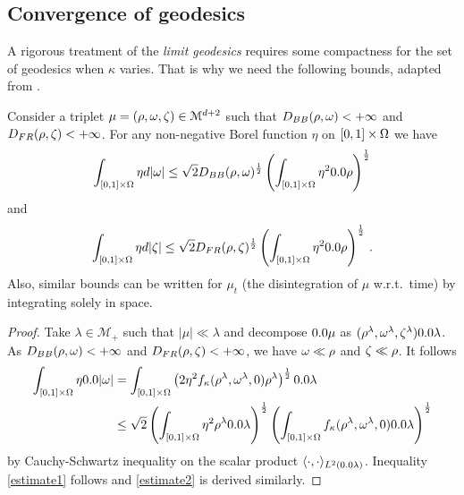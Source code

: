 \subsection{Convergence of geodesics}
\label{sec:limit metrics}

A rigorous treatment of the \emph{limit geodesics} requires some compactness for the set of geodesics when $\kappa$ varies. That is why we need the following bounds, adapted from \cite[Proposition 3.10]{dolbeault2009new}.

\begin{lemma}
Consider a triplet $\mu=(\rho,\omega,\zeta)\in \mathcal{M}^{d+2}$ such that $D_{BB}(\rho,\omega) <+\infty$ and $D_{FR}(\rho,\zeta)<+\infty$. For any non-negative Borel function $\eta$ on $[0,1] \times \Omega$ we have
\begin{equation}
\int_{[0,1]\times\Om} \eta d|\M| \leq \sqrt2 D_{BB}(\rho,\M)^{\frac12} \left( \int_{[0,1]\times\Om} \eta^2 \d\rho \right)^{\frac12}
\label{estimate1}
\end{equation}
and
\begin{equation}
\int_{[0,1]\times\Om} \eta d|\Z| \leq \sqrt2  D_{FR}(\rho,\Z)^{\frac12} \left( \int_{[0,1]\times\Om} \eta^2 \d\rho \right)^{\frac12}
\,.\label{estimate2}
\end{equation}
Also, similar bounds can be written for $\mu_t$ (the disintegration of $\mu$ w.r.t.\ time) by integrating solely in space.
\end{lemma}

\begin{proof}
Take $\lambda\in \mathcal{M}_+$ such that $|\mu| \ll \lambda$ and decompose $\d\mu$ as $(\rho^{\lambda}, \M^{\lambda}, \Z^{\lambda}) \d\lambda$. As $D_{BB}(\rho,\omega)<+\infty$ and $D_{FR}(\rho,\zeta)<+\infty$, we have $\omega \ll \rho$ and $\zeta \ll \rho$. It follows
\begin{align*}
\int_{[0,1]\times \Om} \eta \d |\M| 
&=  \int_{[0,1]\times \Om} \left( 2 \eta^2 \fonc(\rho^{\lambda},\M^{\lambda},0)\rho^{\lambda} \right)^{\frac12} \d\lambda \\
&\leq \sqrt2 \left( \int_{[0,1]\times \Om} \eta^2 \rho^{\lambda} \d\lambda \right)^{\frac12} 
\left( \int_{[0,1]\times \Om} \fonc(\rho^{\lambda}, \M^{\lambda},0) \d\lambda \right)^{\frac12}
\end{align*}
by Cauchy-Schwartz inequality on the scalar product $\langle \cdot, \cdot \rangle_{L^2(\d\lambda)}$. Inequality \eqref{estimate1} follows and \eqref{estimate2} is derived similarly.
\end{proof}


